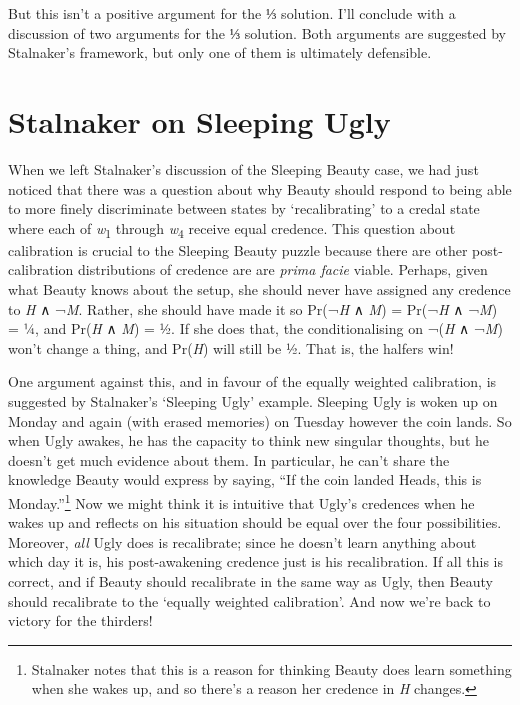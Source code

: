 \documentclass[
  11pt,
  letterpaper,
  DIV=11,
  numbers=noendperiod,
  twoside]{scrartcl}
\begin{document}
But this isn't a positive argument for the ⅓ solution. I'll conclude
with a discussion of two arguments for the ⅓ solution. Both arguments
are suggested by Stalnaker's framework, but only one of them is
ultimately defensible.

\section{Stalnaker on Sleeping Ugly}\label{stalnaker-on-sleeping-ugly}

When we left Stalnaker's discussion of the Sleeping Beauty case, we had
just noticed that there was a question about why Beauty should respond
to being able to more finely discriminate between states by
`recalibrating' to a credal state where each of
\emph{w}\textsubscript{1} through \emph{w}\textsubscript{4} receive
equal credence. This question about calibration is crucial to the
Sleeping Beauty puzzle because there are other post-calibration
distributions of credence are are \emph{prima facie} viable. Perhaps,
given what Beauty knows about the setup, she should never have assigned
any credence to \emph{H} ∧ ¬\emph{M}. Rather, she should have made it so
Pr(¬\emph{H} ∧ \emph{M}) = Pr(¬\emph{H} ∧ ¬\emph{M}) = ¼, and
Pr(\emph{H} ∧ \emph{M}) = ½. If she does that, the conditionalising on
¬(\emph{H} ∧ ¬\emph{M}) won't change a thing, and Pr(\emph{H}) will
still be ½. That is, the halfers win!

One argument against this, and in favour of the equally weighted
calibration, is suggested by Stalnaker's `Sleeping Ugly' example.
Sleeping Ugly is woken up on Monday and again (with erased memories) on
Tuesday however the coin lands. So when Ugly awakes, he has the capacity
to think new singular thoughts, but he doesn't get much evidence about
them. In particular, he can't share the knowledge Beauty would express
by saying, ``If the coin landed Heads, this is Monday.''\footnote{Stalnaker
  notes that this is a reason for thinking Beauty does learn something
  when she wakes up, and so there's a reason her credence in \emph{H}
  changes.} Now we might think it is intuitive that Ugly's credences
when he wakes up and reflects on his situation should be equal over the
four possibilities. Moreover, \emph{all} Ugly does is recalibrate; since
he doesn't learn anything about which day it is, his post-awakening
credence just is his recalibration. If all this is correct, and if
Beauty should recalibrate in the same way as Ugly, then Beauty should
recalibrate to the `equally weighted calibration'. And now we're back to
victory for the thirders!
\end{document}
